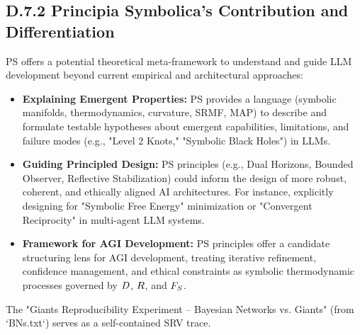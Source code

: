 \subsection*{D.7.2 Principia Symbolica's Contribution and Differentiation} \label{subsec:appD_ai_contribution_differentiation}
PS offers a potential theoretical meta-framework to understand and guide LLM development beyond current empirical and architectural approaches:
\begin{itemize}
    \item \textbf{Explaining Emergent Properties:} PS provides a language (symbolic manifolds, thermodynamics, curvature, SRMF, MAP) to describe and formulate testable hypotheses about emergent capabilities, limitations, and failure modes (e.g., "Level 2 Knots," "Symbolic Black Holes") in LLMs.
    \item \textbf{Guiding Principled Design:} PS principles (e.g., Dual Horizons, Bounded Observer, Reflective Stabilization) could inform the design of more robust, coherent, and ethically aligned AI architectures. For instance, explicitly designing for "Symbolic Free Energy" minimization or "Convergent Reciprocity" in multi-agent LLM systems.
    \item \textbf{Framework for AGI Development:} PS principles offer a candidate structuring lens for AGI development, treating iterative refinement, confidence management, and ethical constraints as symbolic thermodynamic processes governed by $D$, $R$, and $F_S$.
\end{itemize}
The "Giants Reproducibility Experiment – Bayesian Networks vs. Giants" (from `BNs.txt`) serves as a self-contained SRV trace.
